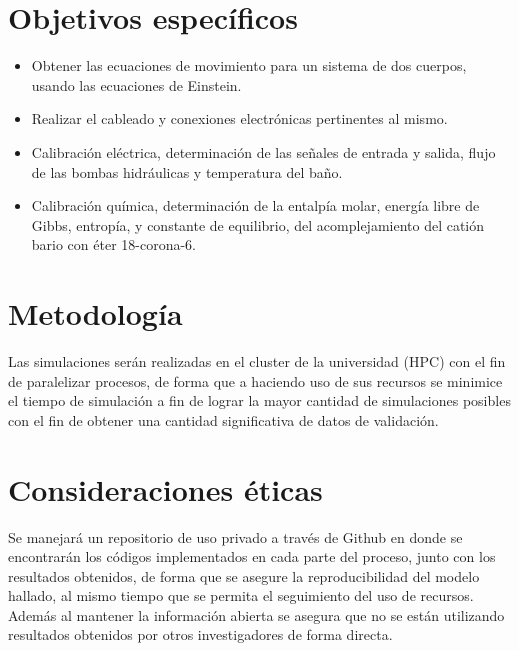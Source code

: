 \section{Objetivos específicos}
	\begin{itemize}
		\item Obtener las ecuaciones de movimiento para un sistema de dos cuerpos, usando las ecuaciones de Einstein.
		\item Realizar el cableado y conexiones electrónicas pertinentes al mismo.
		\item Calibración eléctrica, determinación de las señales de entrada y salida, flujo de las bombas hidráulicas y temperatura del baño.
		\item Calibración química, determinación de la entalpía molar, energía libre de Gibbs, entropía, y constante de equilibrio, del acomplejamiento del catión bario con éter 18-corona-6.
	\end{itemize}
	
\section{Metodología}
	Las simulaciones ser\'an realizadas en el cluster de la universidad (HPC) con el fin de paralelizar procesos, de forma que a haciendo uso de sus recursos se minimice el tiempo de simulación a fin de lograr la mayor cantidad de simulaciones posibles con el fin de obtener una cantidad significativa de datos de validación.
	
\section{Consideraciones éticas}
	Se manejará un repositorio de uso privado a través de Github en donde se encontrar\'an los códigos implementados en cada parte del proceso, junto con los resultados obtenidos, de forma que se asegure la reproducibilidad del modelo hallado, al mismo tiempo que se permita el seguimiento del uso de recursos. Adem\'as al mantener la informaci\'on abierta se asegura que no se están utilizando resultados obtenidos por otros investigadores de forma directa.
	
